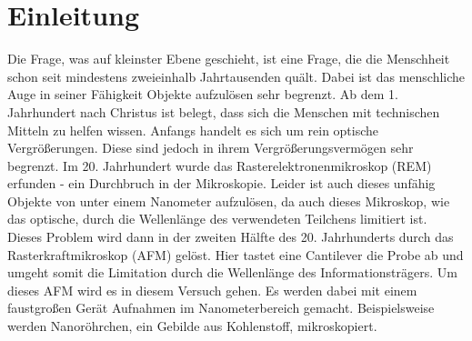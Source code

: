 

\chapter{Einleitung}
\label{chap:einleitung}

Die Frage, was auf kleinster Ebene geschieht, ist eine Frage, die die Menschheit schon seit mindestens zweieinhalb Jahrtausenden 
quält. Dabei ist das menschliche Auge in seiner Fähigkeit Objekte aufzulösen sehr begrenzt. Ab dem 1. Jahrhundert nach Christus ist belegt, 
dass sich die Menschen mit technischen Mitteln zu helfen wissen. Anfangs handelt es sich um rein optische Vergrößerungen. Diese sind jedoch in ihrem Vergrößerungsvermögen sehr 
begrenzt. Im 20. Jahrhundert wurde das Rasterelektronenmikroskop (REM) erfunden - ein Durchbruch in der Mikroskopie. Leider ist auch dieses unfähig Objekte von unter einem Nanometer 
aufzulösen, da auch dieses Mikroskop, wie das optische, durch die Wellenlänge des verwendeten Teilchens limitiert ist. Dieses Problem wird dann in der zweiten Hälfte des 20. 
Jahrhunderts durch das Rasterkraftmikroskop (AFM) gelöst. Hier tastet eine Cantilever die Probe ab und umgeht somit die Limitation durch die Wellenlänge des Informationsträgers. 
Um dieses AFM wird es in diesem Versuch gehen. Es werden dabei mit einem faustgroßen Gerät Aufnahmen im Nanometerbereich gemacht. Beispielsweise werden Nanoröhrchen, ein 
Gebilde aus Kohlenstoff, mikroskopiert. 